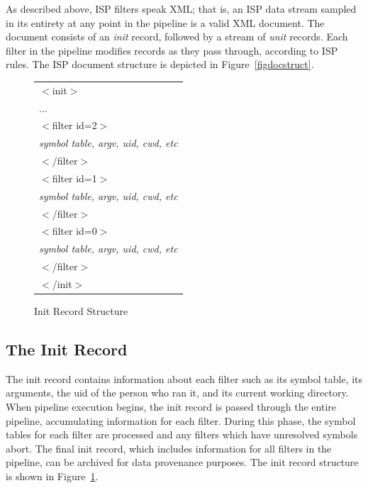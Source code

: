 \documentclass{article}
\begin{document}
As described above, ISP filters speak XML; that is, an ISP data stream 
sampled in its entirety at any point in the pipeline is a valid XML 
document.
The document consists of an {\em init} record, followed by 
a stream of {\em unit} records.  Each filter in the pipeline modifies 
records as they pass through, according to ISP rules.  
The ISP document structure is depicted in Figure~\ref{figdocstruct}.

\begin{figure}
\begin{center}
\begin{tabular}{|l|}\hline
$<$init$>$\\
...\\
$<$filter id=2$>$\\
{\em symbol table, argv, uid, cwd, etc}\\
$<$/filter$>$\\
$<$filter id=1$>$\\
{\em symbol table, argv, uid, cwd, etc}\\
$<$/filter$>$\\
$<$filter id=0$>$\\
{\em symbol table, argv, uid, cwd, etc}\\
$<$/filter$>$\\
$<$/init$>$\\
\hline
\end{tabular}
\end{center}
\caption{Init Record Structure}\label{figinit}
\end{figure}

\subsection{The Init Record}\label{secinit}

The init record contains information about each filter such as 
its symbol table, 
its arguments,
the uid of the person who ran it, 
and its current working directory.
When pipeline execution begins, the init record is passed through the 
entire pipeline, accumulating information for each filter.
During this phase, the symbol tables for each filter are processed and
any filters which have unresolved symbols abort.
The final init record, which includes information for all 
filters in the pipeline, can be archived for data provenance purposes.
The init record structure is shown in Figure~\ref{figinit}.
\end{document}
